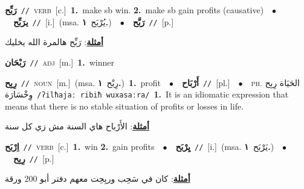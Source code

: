 \documentclass[10pt,a4paper,twoside]{article} %
\begin{document}
\begin{multicols}{2}
{{{{{{{\setlength\topsep{0pt}\textbf{\foreignlanguage{arabic}{رَبِّح}}\ {\color{gray}\texttt{//}\color{black}}\ \textsc{verb}\ [c.]\ \textbf{1.}~make sb win.  \textbf{2.}~make sb gain profits (causative)\ \ $\bullet$\ \ \setlength\topsep{0pt}\textbf{\foreignlanguage{arabic}{يرَبِّح}}\ {\color{gray}\texttt{//}\color{black}}\ [i.]\ \color{gray}(msa. \foreignlanguage{arabic}{يُرْبَح}~\foreignlanguage{arabic}{\textbf{١.}})\color{black}\ \ $\bullet$\ \ \setlength\topsep{0pt}\textbf{\foreignlanguage{arabic}{رَبَّح}}\ {\color{gray}\texttt{//}\color{black}}\ [p.]\  \begin{flushright}\color{gray}\foreignlanguage{arabic}{\textbf{\underline{\foreignlanguage{arabic}{أمثلة}}}: رَبِّح هالمرة الله يخليك}\end{flushright}\color{black}} \vspace{2mm}

{\setlength\topsep{0pt}\textbf{\foreignlanguage{arabic}{رَبْحَان}}\ {\color{gray}\texttt{//}\color{black}}\ \textsc{adj}\ [m.]\ \textbf{1.}~winner\ 

{\setlength\topsep{0pt}\textbf{\foreignlanguage{arabic}{رِبِح}}\ {\color{gray}\texttt{//}\color{black}}\ \textsc{noun}\ [m.]\ \color{gray}(msa. \foreignlanguage{arabic}{رِبْح}~\foreignlanguage{arabic}{\textbf{١.}})\color{black}\ \textbf{1.}~profit\ \ $\bullet$\ \ \setlength\topsep{0pt}\textbf{\foreignlanguage{arabic}{أَرْبَاح}}\ {\color{gray}\texttt{//}\color{black}}\ [pl.]\ \ $\bullet$\ \ \textsc{ph.} \color{gray} \foreignlanguage{arabic}{الحَيَاة رِبِح وِخْسَارَة}\color{black}\ {\color{gray}\texttt{/{\sffamily ʔilħajaː ribiħ wuxasaːra}/}\color{black}}\ \textbf{1.}~It is an idiomatic expression that means that there is no stable situation of profits or losses in life.\  \begin{flushright}\color{gray}\foreignlanguage{arabic}{\textbf{\underline{\foreignlanguage{arabic}{أمثلة}}}: الأَرْباح هاي السنة مش زي كل سنة}\end{flushright}\color{black}} \vspace{2mm}

{\setlength\topsep{0pt}\textbf{\foreignlanguage{arabic}{اِرْبَح}}\ {\color{gray}\texttt{//}\color{black}}\ \textsc{verb}\ [c.]\ \textbf{1.}~win  \textbf{2.}~gain profits\ \ $\bullet$\ \ \setlength\topsep{0pt}\textbf{\foreignlanguage{arabic}{يِرْبَح}}\ {\color{gray}\texttt{//}\color{black}}\ [i.]\ \color{gray}(msa. \foreignlanguage{arabic}{يَرْبَح}~\foreignlanguage{arabic}{\textbf{١.}})\color{black}\ \ $\bullet$\ \ \setlength\topsep{0pt}\textbf{\foreignlanguage{arabic}{رِبِح}}\ {\color{gray}\texttt{//}\color{black}}\ [p.]\  \begin{flushright}\color{gray}\foreignlanguage{arabic}{\textbf{\underline{\foreignlanguage{arabic}{أمثلة}}}: كان في سَحِب وربِحِت معهم دفتر أبو 200 ورقة}\end{flushright}\color{black}} \vspace{2mm}

}}}}}}}
\end{multicols}
\end{document}

